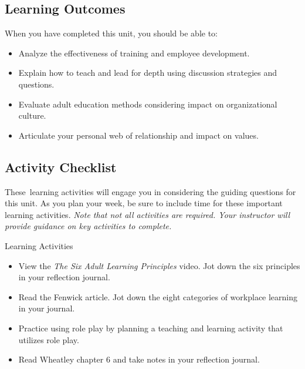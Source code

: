 \documentclass[
]{book}
\providecommand{\tightlist}{%
  \setlength{\itemsep}{0pt}\setlength{\parskip}{0pt}}
\begin{document}
\hypertarget{learning-outcomes-7}{%
\subsection*{Learning Outcomes}\label{learning-outcomes-7}}

When you have completed this unit, you should be able to:

\begin{itemize}
\tightlist
\item
  Analyze the effectiveness of training and employee development.\\
\item
  Explain how to teach and lead for depth using discussion strategies and questions.\\
\item
  Evaluate adult education methods considering impact on organizational culture.\\
\item
  Articulate your personal web of relationship and impact on values.
\end{itemize}

\hypertarget{activity-checklist-7}{%
\subsection*{Activity Checklist}\label{activity-checklist-7}}

These~learning activities will engage you in considering the guiding questions for this unit. As you plan your week, be sure to include time for these important learning activities. \emph{Note that not all activities are required. Your instructor will provide guidance on key activities to complete.}

\begin{reflect}
{Learning Activities}

\begin{itemize}
\tightlist
\item
  View the \emph{The Six Adult Learning Principles} video. Jot down the
  six principles in your reflection journal.\\
\item
  Read the Fenwick article. Jot down the eight categories of workplace
  learning in your journal.\\
\item
  Practice using role play by planning a teaching and learning activity
  that utilizes role play.\\
\item
  Read Wheatley chapter 6 and take notes in your reflection journal.
\end{itemize}
\end{reflect}
\end{document}

